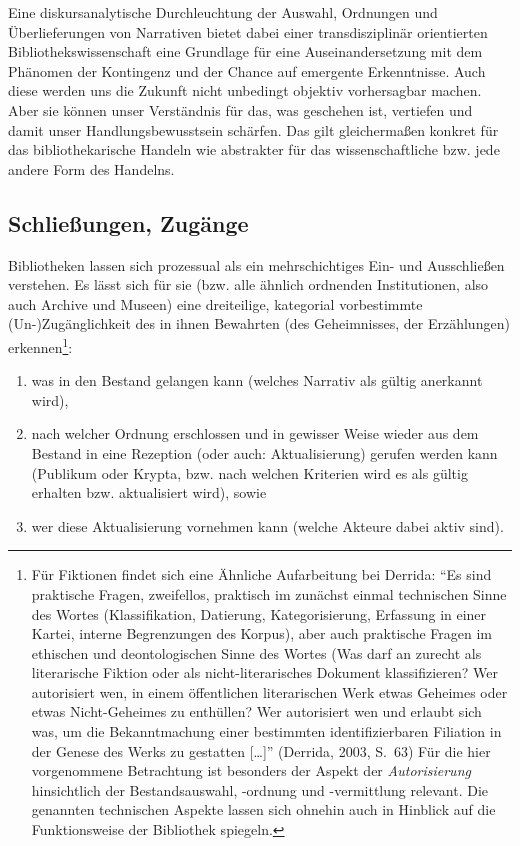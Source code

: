 \documentclass[output=paper]{langscibook}
\begin{document}
Eine diskursanalytische Durchleuchtung der Auswahl, Ordnungen und
Überlieferungen von Narrativen bietet dabei einer transdisziplinär
orientierten Bibliothekswissenschaft eine Grundlage für eine
Auseinandersetzung mit dem Phänomen der Kontingenz und der Chance auf
emergente Erkenntnisse. Auch diese werden uns die Zukunft nicht
unbedingt objektiv vorhersagbar machen. Aber sie können unser
Verständnis für das, was geschehen ist, vertiefen und damit unser
Handlungsbewusstsein schärfen. Das gilt gleichermaßen konkret für das
bibliothekarische Handeln wie abstrakter für das wissenschaftliche bzw.
jede andere Form des Handelns.

\hypertarget{schlieuxdfungen-zuguxe4nge}{%
\subsection*{Schließungen, Zugänge}\label{schlieuxdfungen-zuguxe4nge}}

Bibliotheken lassen sich prozessual als ein mehrschichtiges Ein- und
Ausschließen verstehen. Es lässt sich für sie (bzw. alle ähnlich
ordnenden Institutionen, also auch Archive und Museen) eine dreiteilige,
kategorial vorbestimmte (Un-)Zugänglichkeit des in ihnen Bewahrten (des
Geheimnisses, der Erzählungen) erkennen\footnote{Für Fiktionen findet
  sich eine Ähnliche Aufarbeitung bei Derrida: \enquote{Es sind
  praktische Fragen, zweifellos, praktisch im zunächst einmal
  technischen Sinne des Wortes (Klassifikation, Datierung,
  Kategorisierung, Erfassung in einer Kartei, interne Begrenzungen des
  Korpus), aber auch praktische Fragen im ethischen und deontologischen
  Sinne des Wortes (Was darf an zurecht als literarische Fiktion oder
  als nicht-literarisches Dokument klassifizieren? Wer autorisiert wen,
  in einem öffentlichen literarischen Werk etwas Geheimes oder etwas
  Nicht-Geheimes zu enthüllen? Wer autorisiert wen und erlaubt sich was,
  um die Bekanntmachung einer bestimmten identifizierbaren Filiation in
  der Genese des Werks zu gestatten {[}\ldots{]}} (Derrida, 2003, S.~63)
  Für die hier vorgenommene Betrachtung ist besonders der Aspekt der
  \emph{Autorisierung} hinsichtlich der Bestandsauswahl, -ordnung und
  -vermittlung relevant. Die genannten technischen Aspekte lassen sich
  ohnehin auch in Hinblick auf die Funktionsweise der Bibliothek
  spiegeln.}:

\begin{enumerate}
\def\labelenumi{\arabic{enumi}.}
\item
  was in den Bestand gelangen kann (welches Narrativ als gültig
  anerkannt wird),
\item
  nach welcher Ordnung erschlossen und in gewisser Weise wieder aus dem
  Bestand in eine Rezeption (oder auch: Aktualisierung) gerufen werden
  kann (Publikum oder Krypta, bzw. nach welchen Kriterien wird es als
  gültig erhalten bzw. aktualisiert wird), sowie
\item
  wer diese Aktualisierung vornehmen kann (welche Akteure dabei aktiv
  sind).
\end{enumerate}
\end{document}
